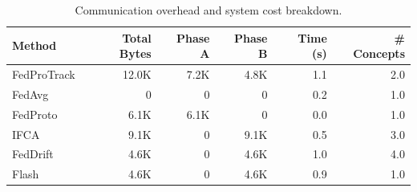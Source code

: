 \begin{table}[t]
\centering
\caption{Communication overhead and system cost breakdown.}
\label{tab:overhead}
\begin{tabular}{lrrrrr}
\toprule
Method & Total Bytes & Phase A & Phase B & Time (s) & \# Concepts \\
\midrule
FedProTrack & 12.0K & 7.2K & 4.8K & 1.1 & 2.0 \\
FedAvg & 0 & 0 & 0 & 0.2 & 1.0 \\
FedProto & 6.1K & 6.1K & 0 & 0.0 & 1.0 \\
IFCA & 9.1K & 0 & 9.1K & 0.5 & 3.0 \\
FedDrift & 4.6K & 0 & 4.6K & 1.0 & 4.0 \\
Flash & 4.6K & 0 & 4.6K & 0.9 & 1.0 \\
\bottomrule
\end{tabular}
\end{table}